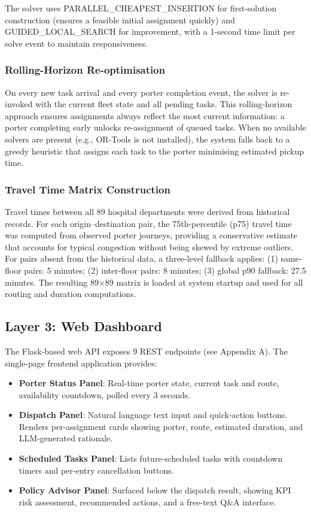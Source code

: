 \documentclass[12pt,a4paper]{article}
\begin{document}
The solver uses PARALLEL\_CHEAPEST\_INSERTION for first-solution construction (ensures a feasible initial assignment quickly) and GUIDED\_LOCAL\_SEARCH for improvement, with a 1-second time limit per solve event to maintain responsiveness.

\subsubsection{Rolling-Horizon Re-optimisation}

On every new task arrival and every porter completion event, the solver is re-invoked with the current fleet state and all pending tasks. This rolling-horizon approach ensures assignments always reflect the most current information: a porter completing early unlocks re-assignment of queued tasks. When no available solvers are present (e.g., OR-Tools is not installed), the system falls back to a greedy heuristic that assigns each task to the porter minimising estimated pickup time.

\subsubsection{Travel Time Matrix Construction}
\label{sec:travel}

Travel times between all 89 hospital departments were derived from historical  records. For each origin--destination pair, the 75th-percentile (p75) travel time was computed from observed porter journeys, providing a conservative estimate that accounts for typical congestion without being skewed by extreme outliers. For pairs absent from the historical data, a three-level fallback applies: (1) same-floor pairs: 5 minutes; (2) inter-floor pairs: 8 minutes; (3) global p90 fallback: 27.5 minutes. The resulting 89$\times$89 matrix is loaded at system startup and used for all routing and duration computations.

\subsection{Layer 3: Web Dashboard}

The Flask-based web API exposes 9 REST endpoints (see Appendix A). The single-page frontend application provides:

\begin{itemize}
  \item \textbf{Porter Status Panel}: Real-time porter state, current task and route, availability countdown, polled every 3 seconds.
  \item \textbf{Dispatch Panel}: Natural language text input and quick-action buttons. Renders per-assignment cards showing porter, route, estimated duration, and LLM-generated rationale.
  \item \textbf{Scheduled Tasks Panel}: Lists future-scheduled tasks with countdown timers and per-entry cancellation buttons.
  \item \textbf{Policy Advisor Panel}: Surfaced below the dispatch result, showing KPI risk assessment, recommended actions, and a free-text Q\&A interface.
\end{itemize}
\end{document}
